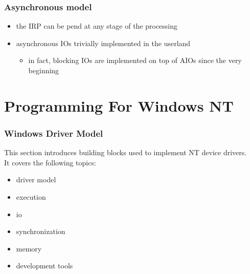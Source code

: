 
\begin{frame}
 \frametitle{Asynchronous model}
 \begin{itemize}
   \item
     the IRP can be pend at any stage of the processing
   \item
     asynchronous IOs trivially implemented in the userland
     \begin{itemize}
       \item
         in fact, blocking IOs are implemented on top of AIOs since the very beginning
     \end{itemize}
 \end{itemize}
\end{frame}



%
%

\section{Programming For Windows NT}


\begin{frame}
  \frametitle{Windows Driver Model}

 This section introduces building blocks used to implement NT device drivers. \\
 It covers the following topics:
 \begin{itemize}
 \item
   driver model
 \item
   execution
 \item
   io
 \item
   synchronization
 \item
   memory 
 \item
   development tools
 \end{itemize}

\end{frame}


